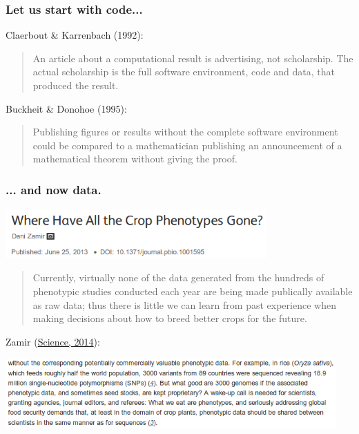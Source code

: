 \documentclass[c]{beamer} %
\begin{document}
\begin{frame}
  \frametitle{Let us start with code...}
  Claerbout \& Karrenbach (1992):
  \begin{quote}
    An article about a computational result is advertising, not scholarship. The actual scholarship is the full software environment, code and data, that produced the result.
  \end{quote}
  
  \bigskip
  \pause
  
  Buckheit \& Donohoe (1995):
  \begin{quote}
    Publishing figures or results without the complete software environment could be compared to a mathematician publishing an announcement of a mathematical theorem without giving the proof.
  \end{quote}
\end{frame}

\begin{frame}
  \frametitle{... and now data.}
  \begin{center}
    \includegraphics[width=0.75\textwidth,height=0.90\textheight,keepaspectratio=true]{2013-06_DZamir_title}%
  \end{center}
  \pause
  \begin{quote}
    Currently, virtually none of the data generated from the hundreds of phenotypic studies conducted each year are being made publically available as raw data; thus there is little we can learn from past experience when making decisions about how to breed better crops for the future.
  \end{quote}
  
  \bigskip
  \pause
  
  Zamir (\href{http://dx.doi.org/10.1126/science.1258941}{Science, 2014}):
  \begin{center}
    \includegraphics[width=0.95\textwidth,height=0.90\textheight,keepaspectratio=true]{2014-09_DZamir_text}%
  \end{center}
\end{frame}
\end{document}
